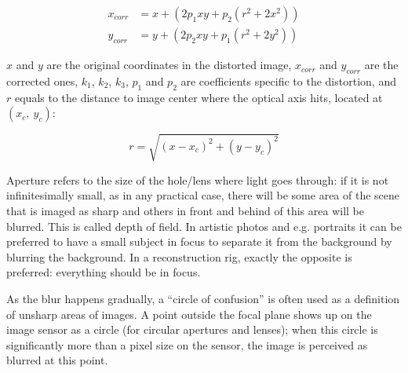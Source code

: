 \begin{align}
x_{corr} &= x + (2 p_1 x y + p_2 (r^2 + 2 x^2))\\
y_{corr} &= y + (2 p_2 x y + p_1 (r^2 + 2 y^2))
\end{align}

$x$ and $y$ are the original coordinates in the distorted image, $x_{corr}$ and $y_{corr}$ are the corrected ones, $k_1$, $k_2$, $k_3$, $p_1$ and $p_2$ are coefficients specific to the distortion, and $r$ equals to the distance to image center where the optical axis hits, located at $(x_c,~y_c)$:

\begin{equation}
r = \sqrt{(x - x_c)^2 + (y - y_c)^2}
\end{equation}





Aperture refers to the size of the hole/lens where light goes through: %
if it is not infinitesimally small, as in any practical case, there will be some area of the scene that is imaged as sharp and others in front and behind of this area will be blurred.
This is called depth of field.
In artistic photos and e.g. portraits it can be preferred to have a small subject in focus to separate it from the background by blurring the background.
In a reconstruction rig, exactly the opposite is preferred: everything should be in focus.

As the blur happens gradually, a ``circle of confusion'' is often used as a definition of unsharp areas of images.
A point outside the focal plane shows up on the image sensor as a circle (for circular apertures and lenses); when this circle is significantly more than a pixel size on the sensor, the image is perceived as blurred at this point.



